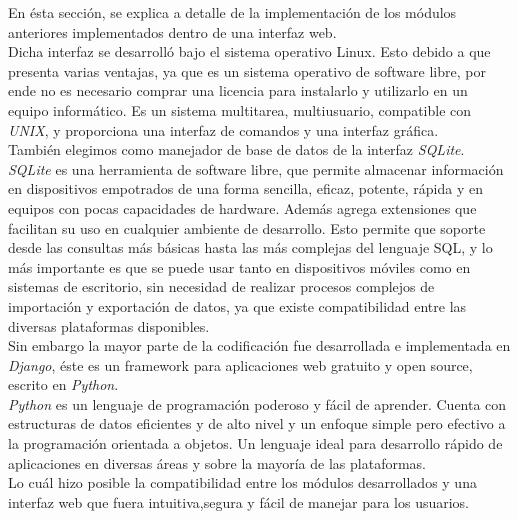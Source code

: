 En ésta sección, se explica a detalle de la implementación de los módulos anteriores implementados dentro de una interfaz web.\\
Dicha interfaz se desarrolló bajo el sistema operativo Linux. Esto debido a que presenta varias ventajas, ya que es un sistema operativo de software libre, por ende no es necesario comprar una licencia para instalarlo y utilizarlo en un equipo informático. Es un sistema multitarea, multiusuario, compatible con \textit{UNIX}, y proporciona una interfaz de comandos y una interfaz gráfica.\\
También elegimos como manejador de base de datos de la interfaz \textit{SQLite}.\\
\textit{SQLite} es una herramienta de software libre, que permite almacenar información en dispositivos empotrados de una forma sencilla, eficaz, potente, rápida y en equipos con pocas capacidades de hardware. Además agrega extensiones que facilitan su uso en cualquier ambiente de desarrollo. Esto permite que soporte desde las consultas más básicas hasta las más complejas del lenguaje SQL, y lo más importante es que se puede usar tanto en dispositivos móviles como en sistemas de escritorio, sin necesidad de realizar procesos complejos de importación y exportación de datos, ya que existe compatibilidad entre las diversas plataformas disponibles.\\
Sin embargo la mayor parte de la codificación fue desarrollada e implementada en \textit{Django}, éste es un framework para aplicaciones web gratuito y open source, escrito en \textit{Python}.\\
\textit{Python} es un lenguaje de programación poderoso y fácil de aprender. Cuenta con estructuras de datos eficientes y de alto nivel y un enfoque simple pero efectivo a la programación orientada a objetos. Un lenguaje ideal para desarrollo rápido de aplicaciones en diversas áreas y sobre la mayoría de las plataformas.\\
Lo cuál hizo posible la compatibilidad entre los módulos desarrollados y una interfaz web que fuera intuitiva,segura y fácil de manejar para los usuarios.\\ 



